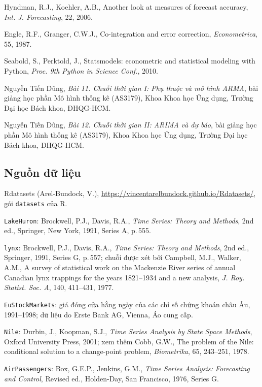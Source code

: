 \begin{enumerate}[label={[\arabic*]},leftmargin=1.2cm,itemsep=1pt,topsep=2pt]
\item \hypertarget{tl11}{}Hyndman, R.J., Koehler, A.B., Another look at measures of forecast accuracy, \textit{Int. J. Forecasting}, 22, 2006.
\item \hypertarget{tl12}{}Engle, R.F., Granger, C.W.J., Co-integration and error correction, \textit{Econometrica}, 55, 1987.
\item \hypertarget{tl13}{}Seabold, S., Perktold, J., Statsmodels: econometric and statistical modeling with Python, \textit{Proc. 9th Python in Science Conf.}, 2010.
\item \hypertarget{tl14}{}Nguyễn Tiến Dũng, \textit{Bài 11. Chuỗi thời gian I: Phụ thuộc và mô hình ARMA}, bài giảng học phần Mô hình thống kê (AS3179), Khoa Khoa học Ứng dụng, Trường Đại học Bách khoa, ĐHQG-HCM.
\item \hypertarget{tl15}{}Nguyễn Tiến Dũng, \textit{Bài 12. Chuỗi thời gian II: ARIMA và dự báo}, bài giảng học phần Mô hình thống kê (AS3179), Khoa Khoa học Ứng dụng, Trường Đại học Bách khoa, ĐHQG-HCM.
\end{enumerate}

\subsection*{Nguồn dữ liệu}
\begin{enumerate}[label={[DL\arabic*]},leftmargin=1.2cm,itemsep=1pt,topsep=2pt]
\item \hypertarget{dl1}{}Rdatasets (Arel-Bundock, V.), \url{https://vincentarelbundock.github.io/Rdatasets/}, gói \texttt{datasets} của R.
\item \hypertarget{dl2}{}\texttt{LakeHuron}: Brockwell, P.J., Davis, R.A., \textit{Time Series: Theory and Methods}, 2nd ed., Springer, New York, 1991, Series A, p.\,555.
\item \hypertarget{dl3}{}\texttt{lynx}: Brockwell, P.J., Davis, R.A., \textit{Time Series: Theory and Methods}, 2nd ed., Springer, 1991, Series G, p.\,557; chuỗi được xét bởi Campbell, M.J., Walker, A.M., A survey of statistical work on the Mackenzie River series of annual Canadian lynx trappings for the years 1821--1934 and a new analysis, \textit{J. Roy. Statist. Soc. A}, 140, 411--431, 1977.
\item \hypertarget{dl4}{}\texttt{EuStockMarkets}: giá đóng cửa hằng ngày của các chỉ số chứng khoán châu Âu, 1991--1998; dữ liệu do Erste Bank AG, Vienna, Áo cung cấp.
\item \hypertarget{dl5}{}\texttt{Nile}: Durbin, J., Koopman, S.J., \textit{Time Series Analysis by State Space Methods}, Oxford University Press, 2001; xem thêm Cobb, G.W., The problem of the Nile: conditional solution to a change-point problem, \textit{Biometrika}, 65, 243--251, 1978.
\item \hypertarget{dl6}{}\texttt{AirPassengers}: Box, G.E.P., Jenkins, G.M., \textit{Time Series Analysis: Forecasting and Control}, Revised ed., Holden-Day, San Francisco, 1976, Series G.
\end{enumerate}
\endgroup
